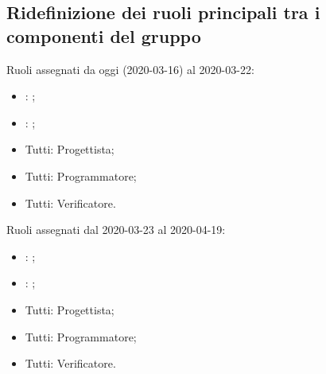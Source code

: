 \subsection{Ridefinizione dei ruoli principali tra i componenti del gruppo}
Ruoli assegnati da oggi (2020-03-16) al 2020-03-22:
\begin{itemize}
	\item \DF{}: \Responsabile{};
	\item \PF{}: \Amministratore{};
	\item Tutti: Progettista; 
	\item Tutti: Programmatore;
	\item Tutti: Verificatore.
\end{itemize}

Ruoli assegnati dal 2020-03-23 al 2020-04-19:
\begin{itemize}
	\item \AT{}: \Responsabile{}; 
	\item \MC{}: \Amministratore{};
	\item Tutti: Progettista; 
	\item Tutti: Programmatore;
	\item Tutti: Verificatore.
\end{itemize}


\clearpage